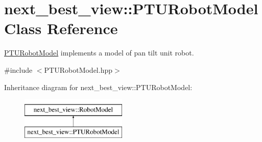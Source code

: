 \hypertarget{classnext__best__view_1_1PTURobotModel}{\section{next\-\_\-best\-\_\-view\-:\-:\-P\-T\-U\-Robot\-Model \-Class \-Reference}
\label{classnext__best__view_1_1PTURobotModel}
}


\hyperlink{classnext__best__view_1_1PTURobotModel}{\-P\-T\-U\-Robot\-Model} implements a model of pan tilt unit robot.  




{\ttfamily \#include $<$\-P\-T\-U\-Robot\-Model.\-hpp$>$}

\-Inheritance diagram for next\-\_\-best\-\_\-view\-:\-:\-P\-T\-U\-Robot\-Model\-:\begin{figure}[H]
\begin{center}
\leavevmode
\includegraphics[height=2.000000cm]{classnext__best__view_1_1PTURobotModel}
\end{center}
\end{figure}
